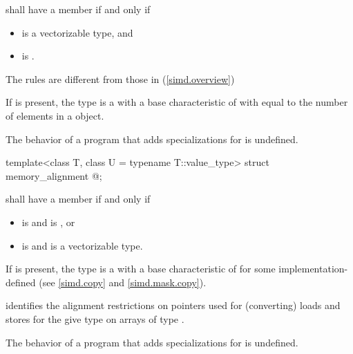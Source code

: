 \begin{itemdescr}
\pnum
{} shall have a member  if and only if
\begin{itemize}
  \item {} is a vectorizable type, and
  \item {} is .
\end{itemize}
\begin{note}
  The rules are different from those in (\ref{simd.overview})
\end{note}

\pnum
If  is present, the type  is a  with a base characteristic of  with  equal to the number of elements in a  object. 

\pnum
The behavior of a program that adds specializations for  is undefined.
\end{itemdescr}

\begin{itemdecl}
template<class T, class U = typename T::value_type> struct memory_alignment { @\seebelow@ };
\end{itemdecl}

\begin{itemdescr}
\pnum
{} shall have a member  if and only if
\begin{itemize}
  \item {} is  and  is , or
  \item {} is  and  is a vectorizable type.
\end{itemize}

\pnum
If  is present, the type  is a  with a base characteristic of  for some implementation-defined  (see \ref{simd.copy} and \ref{simd.mask.copy}). \begin{note} identifies the alignment restrictions on pointers used for (converting) loads and stores for the give type  on arrays of type .\end{note}

\pnum
The behavior of a program that adds specializations for  is undefined.
\end{itemdescr}

